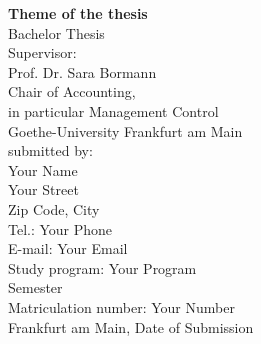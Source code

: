 \begin{titlepage}
    \begin{center}
        \vspace*{2cm}
        {\LARGE \textbf{Theme of the thesis}}\\[2cm]
        {\Large Bachelor Thesis}\\[2cm]

        Supervisor:\\
        Prof. Dr. Sara Bormann\\
        Chair of Accounting,\\
        in particular Management Control\\
        Goethe-University Frankfurt am Main\\[2cm]

        submitted by:\\
        {Your Name}\\
        {Your Street}\\
        {Zip Code, City}\\
        Tel.: {Your Phone}\\
        E-mail: {Your Email}\\
        Study program: {Your Program}\\
        {Semester}\\
        Matriculation number: {Your Number}\\[2cm]

        Frankfurt am Main, {Date of Submission}
    \end{center}
\end{titlepage}